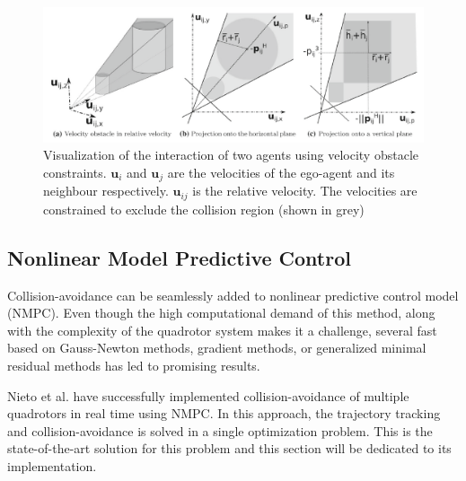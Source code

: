 \begin{figure}
\centering
\includegraphics[width=\textwidth]{./images/velocity_obstacle.png}
\caption[Collision avoidance of a neighbouring agent using the principle of velocity obstacles]{Visualization of the interaction of two agents using velocity obstacle constraints. $\textbf{u}_i$ and $\textbf{u}_j$ are the velocities of the ego-agent and its neighbour respectively. $\textbf{u}_{ij}$ is the relative velocity. The velocities are constrained to exclude the collision region (shown in grey) \cite{alonso2015collision}}
\label{fig:vel_obs}
\end{figure}

\subsection{Nonlinear Model Predictive Control}
Collision-avoidance can be seamlessly added to nonlinear predictive control model (NMPC). Even though the high computational demand of this method, along with the complexity of the quadrotor system makes it a challenge, several fast based on Gauss-Newton methods, gradient methods, or generalized minimal residual methods has led to promising results.

Nieto et al. \cite{kamel2017robust} have successfully implemented collision-avoidance of multiple quadrotors in real time using NMPC. In this approach, the trajectory tracking and collision-avoidance is solved in a single optimization problem. This is the state-of-the-art solution for this problem and this section will be dedicated to its implementation. 

